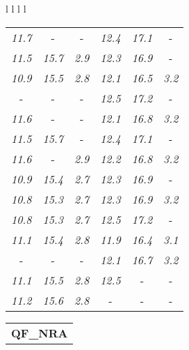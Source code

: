 \documentclass[sigplan,screen]{acmart}
\makeatletter
\newcommand{\ccell}[3][]{%
  \kern-\fboxsep
  \if\relax\detokenize{#1}\relax
    \expandafter\@firstoftwo
  \else
    \expandafter\@secondoftwo
  \fi
  {\colorbox{#2}}%
  {\colorbox[#1]{#2}}%
  {#3}\kern-\fboxsep
}
\makeatother
\begin{document}
\begin{table*}
\begin{tabular}{l l l l}
\begin{tabular}{c c c c c c}
      \textit{11.7} &  \ccell[gray]{0.9}{\textit{15.8}} &  \ccell[gray]{0.9}{\textit{3.0}} & \textit{12.4} & \textit{17.1} &  \ccell[gray]{0.9}{\textit{3.3}} \\
      \textit{11.5} & \textit{15.7} & \textit{2.9} & \textit{12.3} & \textit{16.9} &  \ccell[gray]{0.9}{\textit{3.3}} \\
      \textit{10.9} & \textit{15.5} & \textit{2.8} & \textit{12.1} & \textit{16.5} & \textit{3.2} \\
       \ccell[gray]{0.9}{\textit{11.8}} &  \ccell[gray]{0.9}{\textit{15.8}} &  \ccell[gray]{0.9}{\textit{3.0}} & \textit{12.5} & \textit{17.2} &  \ccell[gray]{0.9}{\textit{3.3}} \\
      \textit{11.6} &  \ccell[gray]{0.9}{\textit{15.8}} &  \ccell[gray]{0.9}{\textit{3.0}} & \textit{12.1} & \textit{16.8} & \textit{3.2} \\
      \textit{11.5} & \textit{15.7} &  \ccell[gray]{0.9}{\textit{3.0}} & \textit{12.4} & \textit{17.1} &  \ccell[gray]{0.9}{\textit{3.3}} \\
      \textit{11.6} &  \ccell[gray]{0.9}{\textit{15.8}} & \textit{2.9} & \textit{12.2} & \textit{16.8} & \textit{3.2} \\
      \textit{10.9} & \textit{15.4} & \textit{2.7} & \textit{12.3} & \textit{16.9} &  \ccell[gray]{0.9}{\textit{3.3}} \\
      \textit{10.8} & \textit{15.3} & \textit{2.7} & \textit{12.3} & \textit{16.9} & \textit{3.2} \\
      \textit{10.8} & \textit{15.3} & \textit{2.7} & \textit{12.5} & \textit{17.2} &  \ccell[gray]{0.9}{\textit{3.3}} \\
      \textit{11.1} & \textit{15.4} & \textit{2.8} & \textit{11.9} & \textit{16.4} & \textit{3.1} \\
       \ccell[gray]{0.9}{\textit{11.8}} &  \ccell[gray]{0.9}{\textit{15.8}} &  \ccell[gray]{0.9}{\textit{3.0}} & \textit{12.1} & \textit{16.7} & \textit{3.2} \\
      \textit{11.1} & \textit{15.5} & \textit{2.8} & \textit{12.5} &  \ccell[gray]{0.9}{\textit{17.3}} &  \ccell[gray]{0.9}{\textit{3.3}} \\
      \textit{11.2} & \textit{15.6} & \textit{2.8} &  \ccell[gray]{0.9}{\textit{12.6}} &  \ccell[gray]{0.9}{\textit{17.3}} &  \ccell[gray]{0.9}{\textit{3.3}} \\
\end{tabular}
\begin{tabular}{c c c c c c}
  \multicolumn{6}{c}{\textbf{QF\_NRA}} \\

\end{tabular}
\end{tabular}
\end{table*}
\end{document}

